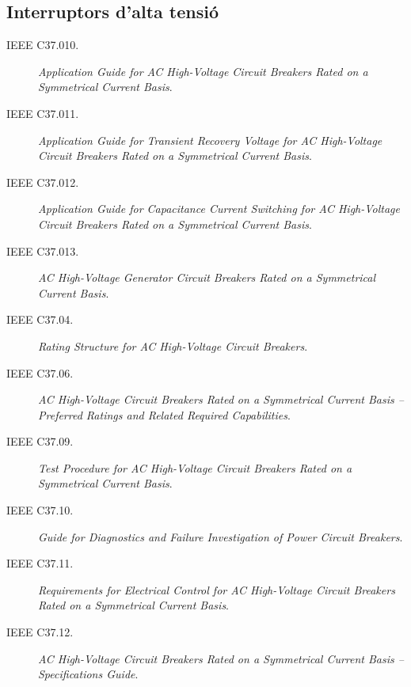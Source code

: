 \subsection*{Interruptors d'alta tensió}
\begin{description}
    \item [\hspace{5mm}IEEE C37.010.] \textit{Application Guide for AC High-Voltage Circuit Breakers Rated on a Symmetrical Current Basis}.
    \item [\hspace{5mm}IEEE C37.011.] \textit{Application Guide for Transient Recovery Voltage for AC High-Voltage Circuit Breakers Rated on a Symmetrical Current Basis}.
    \item [\hspace{5mm}IEEE C37.012.] \textit{Application Guide for Capacitance Current Switching for AC High-Voltage Circuit Breakers Rated on a Symmetrical Current Basis}.
    \item [\hspace{5mm}IEEE C37.013.] \textit{AC High-Voltage Generator Circuit Breakers Rated on a Symmetrical Current Basis}.
    \item [\hspace{5mm}IEEE C37.04.] \textit{Rating Structure for AC High-Voltage Circuit Breakers}.
    \item [\hspace{5mm}IEEE C37.06.] \textit{AC High-Voltage Circuit Breakers Rated on a Symmetrical Current Basis -- Preferred Ratings and Related Required Capabilities}.
    \item [\hspace{5mm}IEEE C37.09.] \textit{Test Procedure for AC High-Voltage Circuit Breakers Rated on a Symmetrical Current Basis}.
    \item [\hspace{5mm}IEEE C37.10.] \textit{Guide for Diagnostics and Failure Investigation of Power Circuit Breakers}.
    \item [\hspace{5mm}IEEE C37.11.] \textit{Requirements for Electrical Control for AC High-Voltage Circuit Breakers Rated on a Symmetrical Current Basis}.
    \item [\hspace{5mm}IEEE C37.12.] \textit{AC High-Voltage Circuit Breakers Rated on a Symmetrical Current Basis -- Specifications Guide}.
\end{description}


